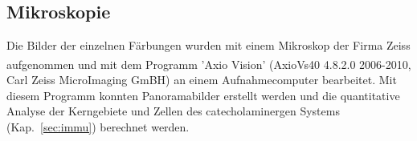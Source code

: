 \subsection{Mikroskopie}

Die Bilder der einzelnen Färbungen wurden mit einem Mikroskop der Firma Zeiss aufgenommen und mit dem Programm 'Axio Vision' (AxioVs40 4.8.2.0 \textsuperscript{\textcopyright} 2006-2010, Carl Zeiss MicroImaging GmBH) an einem Aufnahmecomputer bearbeitet. Mit diesem Programm konnten Panoramabilder erstellt werden und die quantitative Analyse der Kerngebiete und Zellen des catecholaminergen Systems (Kap.~\ref{sec:immu}) berechnet werden.
